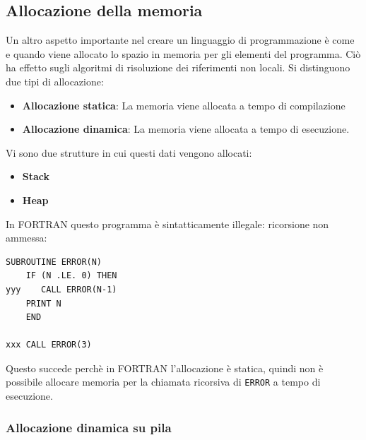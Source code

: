 \documentclass[a4paper]{article}
\begin{document}
\subsection{Allocazione della memoria}

Un altro aspetto importante nel creare un linguaggio di programmazione
è come e quando viene allocato lo spazio in memoria per gli elementi 
del programma. Ciò ha effetto sugli algoritmi di risoluzione dei 
riferimenti non locali. Si distinguono due tipi di allocazione:
\begin{itemize}
  \item \textbf{Allocazione statica}:  La memoria viene allocata a 
  tempo di compilazione
  \item \textbf{Allocazione dinamica}: La memoria viene allocata a 
  tempo di esecuzione.
\end{itemize}

Vi sono due strutture in cui questi dati vengono allocati:
\begin{itemize}
  \item \textbf{Stack} 
  \item \textbf{Heap} 
\end{itemize}

\begin{Example}{}{}
In FORTRAN questo programma è sintatticamente illegale: ricorsione non ammessa:
\begin{lstlisting}
SUBROUTINE ERROR(N)
    IF (N .LE. 0) THEN
yyy    CALL ERROR(N-1)
    PRINT N
    END

xxx CALL ERROR(3)
\end{lstlisting}
Questo succede perchè in FORTRAN l'allocazione è statica, quindi non è possibile allocare
memoria per la chiamata ricorsiva di \texttt{ERROR} a tempo di esecuzione.
\end{Example}

\subsubsection{Allocazione dinamica su pila}
\end{document}
